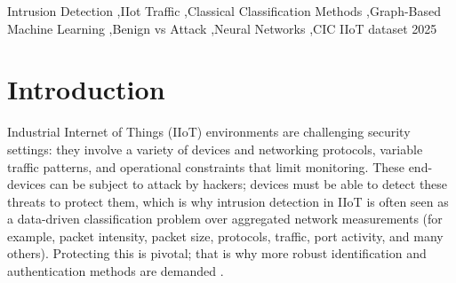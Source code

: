 \documentclass[final,5p,times,twocolumn]{elsarticle}
\begin{document}
\begin{frontmatter}
\begin{abstract}
{\color{red}We then designed graph-based representations that model device-behavior, device-IP, device-port, device-protocol, and device-time relations connecting IIoT device nodes to discretized behavioral-state nodes, and evaluate both knowledge-graph neural network methods and classical machine learning methods on this representation. We referred to this as the rich-graph representation.
}
The later rich-graph GNN experiments, the graph-based GNN outperformed all previous models tested in this study under the current random window-level split, including k-Nearest Neighbors and baseline Logistic Regression. The strongest model was the GraphSAGE-rich architecture (accuracy = 0.997, precision = 0.997, recall = 0.997), followed by GAT-rich (accuracy = 0.962, precision = 0.956, recall = 0.950). These results suggest that adding device, behavioral-state, IP, port, protocol, and temporal nodes improved attack detection beyond the earlier simple graph design and the best classical baseline, k-NN. Other findings were that features such as packet length, address information, TCP activity, and port diversity are strong predictors of attacks; in contrast, the strongest benign predictive features show low-intensity and stable communication patterns, such as fewer packets per window, lower IP and port diversity, and lower TCP-flag activity.
\end{abstract}



\begin{keyword}
Intrusion Detection \sep IIot Traffic \sep Classical Classification Methods \sep Graph-Based Machine Learning \sep Benign vs Attack \sep Neural Networks \sep CIC IIoT dataset 2025
\end{keyword}

\end{frontmatter}

\section{Introduction}
\label{introduction}

Industrial Internet of Things (IIoT) environments are challenging security settings: they involve a variety of devices and networking protocols, variable traffic patterns, and operational constraints that limit monitoring. These end-devices can be subject to attack by hackers; devices must be able to detect these threats to protect them, which is why intrusion detection in IIoT is often seen as a data-driven classification problem over aggregated network measurements (for example, packet intensity, packet size, protocols, traffic, port activity, and many others). Protecting this is pivotal; that is why more robust identification and authentication methods are demanded \citep{jhariya_secure_2026}.
\end{document}
